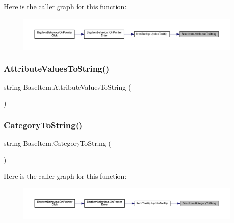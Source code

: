 Here is the caller graph for this function\+:
\nopagebreak
\begin{figure}[H]
\begin{center}
\leavevmode
\includegraphics[width=350pt]{class_base_item_afd59d6b5168af724211f54ad3692ea73_icgraph}
\end{center}
\end{figure}
\mbox{\label{class_base_item_a414dcba1b98b9d67f2254b885049bfca}} 
\subsubsection{\texorpdfstring{AttributeValuesToString()}{AttributeValuesToString()}}
{\footnotesize\ttfamily string Base\+Item.\+Attribute\+Values\+To\+String (\begin{DoxyParamCaption}{ }\end{DoxyParamCaption})}

\mbox{\label{class_base_item_ad820521a001d82fc3f52b2483226efde}} 
\subsubsection{\texorpdfstring{CategoryToString()}{CategoryToString()}}
{\footnotesize\ttfamily string Base\+Item.\+Category\+To\+String (\begin{DoxyParamCaption}{ }\end{DoxyParamCaption})}

Here is the caller graph for this function\+:
\nopagebreak
\begin{figure}[H]
\begin{center}
\leavevmode
\includegraphics[width=350pt]{class_base_item_ad820521a001d82fc3f52b2483226efde_icgraph}
\end{center}
\end{figure}
\mbox{\label{class_base_item_aa3a6bc4a2af6c424898277764e9c0585}} 
